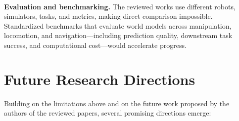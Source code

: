 \documentclass[12pt,a4paper,final]{extreport}
\begin{document}
\paragraph{} \textbf{Evaluation and benchmarking.} The reviewed works use different robots, simulators, tasks, and metrics, making direct comparison impossible. Standardized benchmarks that evaluate world models across manipulation, locomotion, and navigation---including prediction quality, downstream task success, and computational cost---would accelerate progress.

\section{Future Research Directions}

\paragraph{} Building on the limitations above and on the future work proposed by the authors of the reviewed papers, several promising directions emerge:
\end{document}
